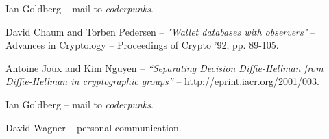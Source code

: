 \documentclass[a4paper,titlepage]{article}
\begin{document}
\begin{thebibliography}{99}

	 Ian Goldberg -- mail to {\sl coderpunks}.

	 David Chaum and Torben Pedersen -- {\sl
	"Wallet databases with observers"} -- Advances in Cryptology
	-- Proceedings of Crypto '92, pp. 89-105.

	 Antoine Joux and Kim Nguyen -- {\sl
	``Separating Decision Diffie-Hellman from Diffie-Hellman in
	cryptographic groups''} -- http://eprint.iacr.org/2001/003.

	 Ian Goldberg -- mail to {\sl coderpunks}.

	 David Wagner -- personal communication.

\end{thebibliography}
\end{document}
